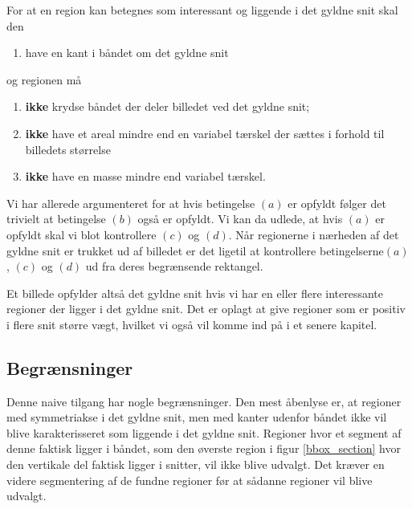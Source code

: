 {\noindent For at en region kan betegnes som interessant og liggende i
det gyldne snit skal den
\begin{enumerate}
	\renewcommand{\labelenumi}{(\alph{enumi})}
	\item have en kant i båndet om det gyldne snit
\end{enumerate}
og regionen må
\begin{enumerate}
	\renewcommand{\labelenumi}{(\alph{enumi})}
	\setcounter{enumi}{1}
	\item \textbf{ikke} krydse båndet der deler billedet ved det gyldne snit;
	\item \textbf{ikke} have et areal mindre end en variabel tærskel der sættes i
		forhold til billedets størrelse
	\item \textbf{ikke} have en masse mindre end variabel tærskel.
\end{enumerate}
Vi har allerede argumenteret for at hvis betingelse $(a)$ er opfyldt
følger det trivielt at betingelse $(b)$ også er opfyldt.  Vi kan da
udlede, at hvis $(a)$ er opfyldt skal vi blot kontrollere $(c)$ og
$(d)$.  Når regionerne i nærheden af det gyldne snit er trukket ud af
billedet er det ligetil at kontrollere betingelserne$(a)$, $(c)$ og
$(d)$ ud fra deres begrænsende rektangel.

Et billede opfylder altså det gyldne snit hvis vi har en eller flere
interessante regioner der ligger i det gyldne snit.  Det er oplagt at
give regioner som er positiv i flere snit større vægt, hvilket vi også
vil komme ind på i et senere kapitel.

\subsection{Begrænsninger}
Denne naive tilgang har nogle begrænsninger.  Den mest åbenlyse er, at
regioner med symmetriakse i det gyldne snit, men med kanter udenfor
båndet ikke vil blive karakterisseret som liggende i det gyldne snit.
Regioner hvor et segment af denne faktisk ligger i båndet, som den
øverste region i figur \ref{bbox_section} hvor den vertikale del faktisk
ligger i snitter, vil ikke blive udvalgt.  Det kræver en videre
segmentering af de fundne regioner før at sådanne regioner vil blive
udvalgt.

}

